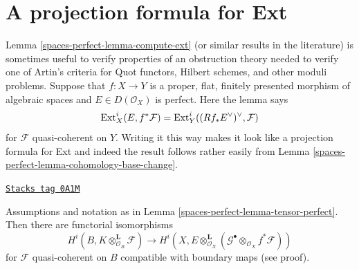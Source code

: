 \section{A projection formula for Ext}
\label{spaces-perfect-section-ext}
Lemma \ref{spaces-perfect-lemma-compute-ext} (or similar results in the literature)
is sometimes useful to verify properties of an obstruction theory needed
to verify one of Artin's criteria
for Quot functors, Hilbert schemes, and other moduli problems.
Suppose that $f : X \to Y$ is a proper, flat, finitely presented
morphism of algebraic spaces and $E \in D(\mathcal{O}_X)$ is perfect.
Here the lemma says
$$
\operatorname{Ext}^i_X(E, f^*\mathcal{F}) =
\operatorname{Ext}^i_Y((Rf_*E^\vee)^\vee, \mathcal{F})
$$
for $\mathcal{F}$ quasi-coherent on $Y$.
Writing it this way makes it look like a projection formula
for Ext and indeed the result follows rather
easily from Lemma \ref{spaces-perfect-lemma-cohomology-base-change}.

\begin{lemma}
\label{spaces-perfect-lemma-compute-tensor-perfect}
\href{https://stacks.math.columbia.edu/tag/0A1M}{\texttt{Stacks tag 0A1M}}

Assumptions and notation as in Lemma \ref{spaces-perfect-lemma-tensor-perfect}.
Then there are functorial isomorphisms
$$
H^i(B, K \otimes^\mathbf{L}_{\mathcal{O}_B} \mathcal{F})
\longrightarrow
H^i(X, E \otimes^\mathbf{L}_{\mathcal{O}_X}
(\mathcal{G}^\bullet \otimes_{\mathcal{O}_X} f^*\mathcal{F}))
$$
for $\mathcal{F}$ quasi-coherent on $B$
compatible with boundary maps (see proof).
\end{lemma}

